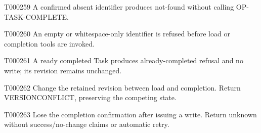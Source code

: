\documentclass[11pt,a4paper]{article}
\begin{document}
\begin{atlasparagraph}{T000259}
A confirmed absent identifier produces not-found without calling OP-TASK-COMPLETE.
\end{atlasparagraph}
\begin{atlasparagraph}{T000260}
An empty or whitespace-only identifier is refused before load or completion tools are invoked.
\end{atlasparagraph}
\begin{atlasparagraph}{T000261}
A ready completed Task produces already-completed refusal and no write; its revision remains unchanged.
\end{atlasparagraph}
\begin{atlasparagraph}{T000262}
Change the retained revision between load and completion. Return VERSION\AtlasCharUnderscore{}CONFLICT, preserving the competing state.
\end{atlasparagraph}
\begin{atlasparagraph}{T000263}
Lose the completion confirmation after issuing a write. Return unknown without success/no-change claims or automatic retry.
\end{atlasparagraph}
\end{document}
